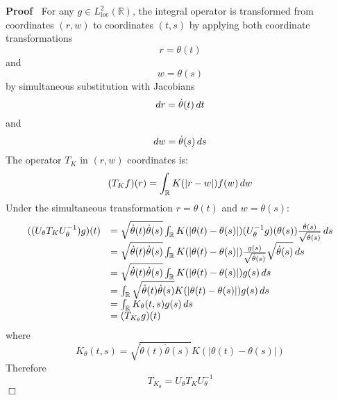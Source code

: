\documentclass{article}
\newcommand{\tmop}[1]{\ensuremath{\operatorname{#1}}}
\newenvironment{proof}{\noindent\textbf{Proof\ }}{\hspace*{\fill}$\Box$\medskip}
\begin{document}
\begin{proof}
  For any $g \in L^2_{\tmop{loc}} (\mathbb{R})$, the integral operator is
  transformed from coordinates $(r, w)$ to coordinates $(t, s)$ by applying
  both coordinate transformations
  \begin{equation}
    r = \theta (t)
  \end{equation}
  and
  \begin{equation}
    w = \theta (s)
  \end{equation}
  by simultaneous substitution with Jacobians
  \begin{equation}
    dr = \dot{\theta} (t)  \hspace{0.17em} dt
  \end{equation}
  and
  \begin{equation}
    dw = \dot{\theta} (s)  \hspace{0.17em} ds
  \end{equation}
  The operator $T_K$ in $(r, w)$ coordinates is:
  \begin{equation}
    (T_K f) (r) = \int_{\mathbb{R}} K (|r - w|) f (w)  \hspace{0.17em} dw
  \end{equation}
  Under the simultaneous transformation $r = \theta (t)$ and $w = \theta (s)$:
  \begin{equation}
    \begin{array}{ll}
      ((U_{\theta} T_K U_{\theta}^{- 1}) g) (t) & = \sqrt{\dot{\theta} (t) 
      \dot{\theta} (s)}  \int_{\mathbb{R}} K (| \theta (t) - \theta (s) |) 
      (U_{\theta}^{- 1} g) (\theta (s)) \frac{\dot{\theta}
      (s)}{\sqrt{\dot{\theta} (s)}}  \hspace{0.17em} ds\\
      & = \sqrt{\dot{\theta} (t)  \dot{\theta} (s)}  \int_{\mathbb{R}} K (|
      \theta (t) - \theta (s) |) \frac{g (s)}{\sqrt{\dot{\theta} (s)}} 
      \sqrt{\dot{\theta} (s)}  \hspace{0.17em} ds\\
      & = \sqrt{\dot{\theta} (t)  \dot{\theta} (s)}  \int_{\mathbb{R}} K (|
      \theta (t) - \theta (s) |) g (s)  \hspace{0.17em} ds\\
      & = \int_{\mathbb{R}} \sqrt{\dot{\theta} (t)  \dot{\theta} (s)} K (|
      \theta (t) - \theta (s) |) g (s)  \hspace{0.17em} ds\\
      & = \int_{\mathbb{R}} K_{\theta} (t, s) g (s)  \hspace{0.17em} ds\\
      & = (T_{K_{\theta}} g) (t)
    \end{array}
  \end{equation}
  where
  \begin{equation}
    K_{\theta} (t, s) = \sqrt{\dot{\theta} (t)  \dot{\theta} (s)} K (| \theta
    (t) - \theta (s) |)
  \end{equation}
  Therefore
  \begin{equation}
    T_{K_{\theta}} = U_{\theta} T_K U_{\theta}^{- 1}
  \end{equation}
\end{proof}
\end{document}
